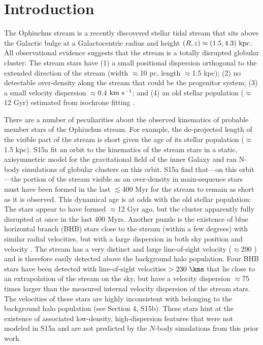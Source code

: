 \documentclass[letterpaper,12pt,preprint]{aastex}
\begin{document}

\section{Introduction}\label{sec:introduction}

The Ophiuchus stream \citep{bernard14, sesar15a} is a recently discovered stellar tidal stream that sits above the Galactic bulge at a Galactocentric radius and height $(R,z) \approx (1.5, 4.3)~{\rm kpc}$. All observational evidence suggests that the stream is a totally disrupted globular cluster: The stream stars have (1) a small positional dispersion orthogonal to the extended direction of the stream (width $\approx$10 pc, length $\approx$1.5 kpc); (2) no detectable over-density along the stream that could be the progenitor system; (3) a small velocity dispersion $\approx$0.4 ${\rm km}~{\rm s}^{-1}$; and (4) an old stellar population ($\approx$12 Gyr) estimated from isochrone fitting \citep[][hereafter S15a]{sesar15a}. 

There are a number of peculiarities about the observed kinematics of probable member stars of the Ophiuchus stream. For example, the de-projected length of the visible part of the stream is short given the age of its stellar population ($\approx$1.5 kpc). S15a fit an orbit to the kinematics of the stream stars in a static, axisymmetric model for the gravitational field of the inner Galaxy and ran N-body simulations of globular clusters on this orbit. S15a find that---on this orbit---the portion of the stream visible as an over-density in main-sequence stars must have been formed in the last $\lesssim$400 Myr for the stream to remain as short as it is observed. This dynamical age is at odds with the old stellar population: The stars appear to have formed $\approx$12 Gyr ago, but the cluster apparently fully disrupted at once in the last 400 Myrs. Another puzzle is the existence of blue horizontal branch (BHB) stars close to the stream (within a few degrees) with similar radial velocities, but with a large dispersion in both sky position and velocity \citep[][hereafter S15b]{sesar15b}. The stream has a very distinct and large line-of-sight velocity ($\approx$290 \kms) and is therefore easily detected above the background halo population. Four BHB stars have been detected with line-of-sight velocities $>230~\kms$ that lie close to an extrapolation of the stream on the sky, but have a velocity dispersion $\approx$75 times larger than the measured internal velocity dispersion of the stream stars. The velocities of these stars are highly inconsistent with belonging to the background halo population (see Section 4, S15b). These stars hint at the existence of associated low-density, high-dispersion features that were not modeled in S15a and are not predicted by the $N$-body simulations from this prior work.
\end{document}
